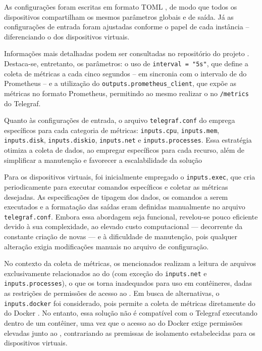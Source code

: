 As configurações foram escritas em formato TOML , de modo que todos os dispositivos compartilham os mesmos parâmetros globais e de saída. Já as configurações de entrada foram ajustadas conforme o papel de cada instância -- diferenciando o  dos dispositivos virtuais.

Informações mais detalhadas podem ser consultadas no repositório do projeto \citep{vitorcossetti2025}. Destaca-se, entretanto, os parâmetros: o uso de \verb|interval = "5s"|, que define a coleta de métricas a cada cinco segundos -- em sincronia com o intervalo de  do Prometheus -- e a utilização do  \verb|outputs.prometheus_client|, que expõe as métricas no formato Prometheus, permitindo ao mesmo realizar o  no  \verb|/metrics| do Telegraf.

Quanto às configurações de entrada, o arquivo \verb|telegraf.conf| do  emprega  específicos para cada categoria de métricas: \verb|inputs.cpu|, \verb|inputs.mem|, \verb|inputs.disk|, \verb|inputs.diskio|, \verb|inputs.net| e \verb|inputs.processes|. Essa estratégia otimiza a coleta de dados, ao empregar  específicos para cada recurso, além de simplificar a manutenção e favorecer a escalabilidade da solução

Para os dispositivos virtuais, foi inicialmente empregado o  \verb|inputs.exec|, que cria  periodicamente para executar comandos específicos e coletar as métricas desejadas. As especificações de tipagem dos dados, os comandos a serem executados e a formatação das saídas eram definidas manualmente no arquivo \verb|telegraf.conf|. Embora essa abordagem seja funcional, revelou-se pouco eficiente devido à sua complexidade, ao elevado custo computacional --- decorrente da constante criação de novas  --- e à dificuldade de manutenção, pois qualquer alteração exigia modificações manuais no arquivo de configuração.

No contexto da coleta de métricas, os  mencionados realizam a leitura de arquivos exclusivamente relacionados ao  do  (com exceção do \verb|inputs.net| e \verb|inputs.processes|), o que os torna inadequados para uso em contêineres, dadas as restrições de permissões de acesso ao . Em busca de alternativas, o  \verb|inputs.docker| foi considerado, pois permite a coleta de métricas diretamente do  do Docker . No entanto, essa solução não é compatível com o Telegraf executando dentro de um contêiner, uma vez que o acesso ao  do Docker exige permissões elevadas junto ao , contrariando as premissas de isolamento estabelecidas para os dispositivos virtuais.

